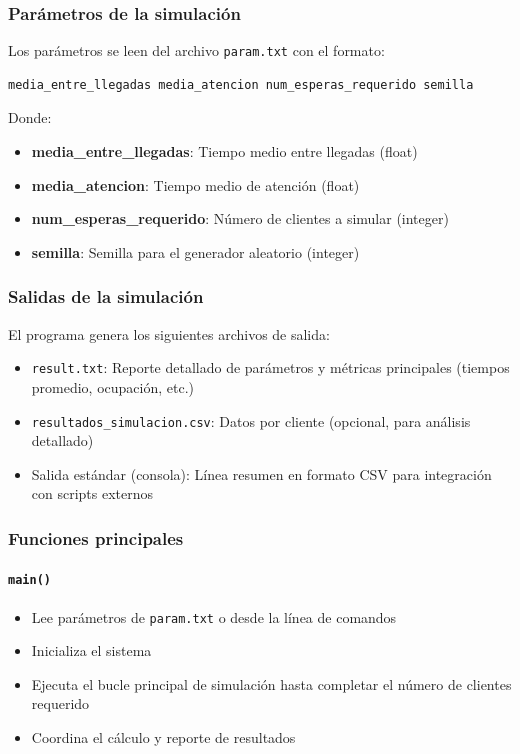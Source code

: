 \documentclass{article}
\begin{document}
\subsubsection{Parámetros de la simulación}

Los parámetros se leen del archivo \texttt{param.txt} con el formato:

\begin{verbatim}
media_entre_llegadas media_atencion num_esperas_requerido semilla
\end{verbatim}

Donde:
\begin{itemize}
    \item \textbf{media\_entre\_llegadas}: Tiempo medio entre llegadas (float)
    \item \textbf{media\_atencion}: Tiempo medio de atención (float)
    \item \textbf{num\_esperas\_requerido}: Número de clientes a simular (integer)
    \item \textbf{semilla}: Semilla para el generador aleatorio (integer)
\end{itemize}

\subsubsection{Salidas de la simulación}

El programa genera los siguientes archivos de salida:

\begin{itemize}
    \item \texttt{result.txt}: Reporte detallado de parámetros y métricas principales (tiempos promedio, ocupación, etc.)
    \item \texttt{resultados\_simulacion.csv}: Datos por cliente (opcional, para análisis detallado)
    \item Salida estándar (consola): Línea resumen en formato CSV para integración con scripts externos
\end{itemize}

\subsubsection{Funciones principales}

\paragraph{\texttt{main()}}
\begin{itemize}
    \item Lee parámetros de \texttt{param.txt} o desde la línea de comandos
    \item Inicializa el sistema
    \item Ejecuta el bucle principal de simulación hasta completar el número de clientes requerido
    \item Coordina el cálculo y reporte de resultados
\end{itemize}
\end{document}
